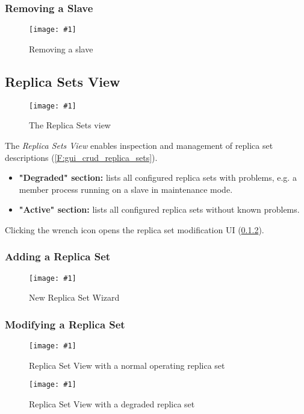 \documentclass[a4paper, 11pt]{article}
\newcommand{\mamidscreenshot}[1]{\texttt{[image: \#1]}}
\newcommand{\uiel}[3]{\item \textbf{"#1" #2:} #3}
\begin{document}
\subsubsection{Removing a Slave}
\begin{figure}[H]
	\centering
	\mamidscreenshot{screenshots/slave_remove}
	\caption{Removing a slave}
\end{figure}


\subsection{Replica Sets View}
\begin{figure}[H]
	\centering
	\mamidscreenshot{screenshots/replica_sets}
	\caption{The Replica Sets view}
\end{figure}
The \textit{Replica Sets View} enables inspection and management of replica set descriptions (\ref{F:gui_crud_replica_sets}).
\begin{itemize}
	\uiel{Degraded}{section}{lists all configured replica sets with problems, e.g. a member process running on a \gls{slave} in \gls{maintenance mode}}.
	\uiel{Active}{section}{lists all configured replica sets without known problems}.
\end{itemize}
Clicking the wrench icon opens the replica set modification UI (\ref{subsec:ui:modify_replica_set}).

\subsubsection{Adding a Replica Set}
\begin{figure}[H]
	\centering
	\mamidscreenshot{screenshots/new_replica_set}
	\caption{New Replica Set Wizard}
\end{figure}
\subsubsection{Modifying a Replica Set}\label{subsec:ui:modify_replica_set}
\begin{figure}[H]
	\centering
	\mamidscreenshot{screenshots/replica_set_overview_active.png}
	\caption{Replica Set View with a normal operating replica set}
\end{figure}
\begin{figure}[H]
	\centering
	\mamidscreenshot{screenshots/replica_set_overview_degraded}
	\caption{Replica Set View with a degraded replica set}
\end{figure}
\end{document}
